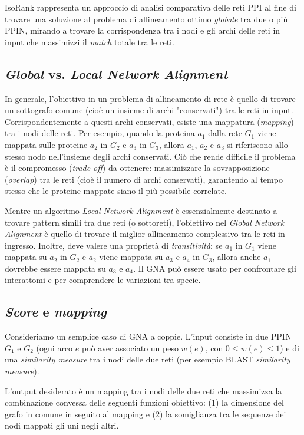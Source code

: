 \documentclass[11pt]{article}
\begin{document}
IsoRank rappresenta un approccio di analisi comparativa delle reti PPI al fine di trovare una soluzione al problema di allineamento ottimo \textit{globale} tra due o più PPIN, mirando a trovare la corrispondenza tra i nodi e gli archi delle reti in input che massimizzi il \textit{match} totale tra le reti.

\subsection{\textit{Global} vs. \textit{Local Network Alignment}}
In generale, l'obiettivo in un problema di allineamento di rete è quello di trovare un sottografo comune (cioè un insieme di archi "conservati") tra le reti in input. Corrispondentemente a questi archi conservati, esiste una mappatura (\textit{mapping}) tra i nodi delle reti. Per esempio, quando la proteina $a_1$ dalla rete $G_1$ viene mappata sulle proteine $a_2$ in $G_2$ e $a_3$ in $G_3$, allora $a_1$, $a_2$ e $a_3$ si riferiscono allo stesso nodo nell'insieme degli archi conservati. Ciò che rende difficile il problema è il compromesso (\textit{trade-off}) da ottenere: massimizzare la sovrapposizione (\textit{overlap}) tra le reti (cioè il numero di archi conservati), garantendo al tempo stesso che le proteine mappate siano il più possibile correlate.

Mentre un algoritmo \textit{Local Network Alignment} è essenzialmente destinato a trovare pattern simili tra due reti (o sottoreti), l'obiettivo nel \textit{Global Network Alignment} è quello di trovare il miglior allineamento complessivo tra le reti in ingresso.
Inoltre, deve valere una proprietà di \textit{transitività}: se $a_1$ in $G_1$ viene mappata su $a_2$ in $G_2$ e $a_2$ viene mappata su $a_3$ e $a_4$ in $G_3$, allora anche $a_1$ dovrebbe essere mappata su $a_3$ e $a_4$. Il GNA può essere usato per confrontare gli interattomi e per comprendere le variazioni tra specie.

\subsection{\textit{Score} e \textit{mapping}}
Consideriamo un semplice caso di GNA a coppie. L'input consiste in due PPIN $G_1$ e $G_2$ (ogni arco $e$ può aver associato un peso $w(e)$, con $0\leq w(e) \leq1$) e di una \textit{similarity measure} tra i nodi delle due reti (per esempio BLAST \textit{similarity measure}).

L'output desiderato è un mapping tra i nodi delle due reti che massimizza la combinazione convessa delle seguenti funzioni obiettivo: (1) la dimensione del grafo in comune in seguito al mapping e (2) la somiglianza tra le sequenze dei nodi mappati gli uni negli altri.
\end{document}
